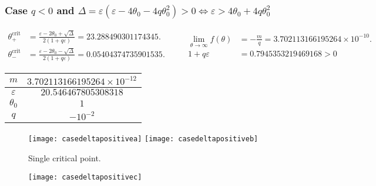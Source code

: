 \documentclass[
    8pt,
    aspectratio=1610,
    c,
    intlimits,
    leqno,
    professionalfonts,
]{beamer}
\begin{document}
\begin{frame}
	\frametitle{Case $q<0$ and
		\begin{math}
			\Delta=
			\varepsilon\left(\varepsilon-4\theta_{0}-4q\theta^{2}_{0}\right)>
			0\iff\varepsilon>4\theta_{0}+4q\theta^{2}_{0}
		\end{math}
	}
	\begin{equation*}
		\begin{aligned}
			\theta^{\text{crit}}_{+} & =
			\frac{
				\varepsilon-2\theta_{0}+\sqrt{\Delta}
			}{
				2\left(1+q\varepsilon\right)
			}=
			23.288490301174345.          \\
			\theta^{\text{crit}}_{-} & =
			\frac{
				\varepsilon-2\theta_{0}-\sqrt{\Delta}
			}{
				2\left(1+q\varepsilon\right)
			}=
			0.05404374735901535.
		\end{aligned}\qquad
		\begin{aligned}
			\lim_{\theta\to\infty}f\left(\theta\right) & =
			-\frac{m}{q}=
			3.702113166195264\times 10^{-10}.              \\
			1+q\varepsilon                             & =
			0.7945353219469168>0
		\end{aligned}
	\end{equation*}

	\begin{table}[ht!]
		\begin{tabular}{cc}
			\hline
			$m$           & $3.702113166195264\times 10^{-12}$ \\
			\hline
			$\varepsilon$ & $20.546467805308318$               \\
			\hline
			$\theta_{0}$  & $1$                                \\
			\hline
			$q$           & $-10^{-2}$                         \\
			\hline
		\end{tabular}
	\end{table}

	\begin{figure}[ht!]
		\centering
		\texttt{[image: casedeltapositivea]}
		\texttt{[image: casedeltapositiveb]}
		\caption{Single critical point.}
	\end{figure}
\end{frame}

\begin{frame}
	\begin{figure}[ht!]
		\centering
		\texttt{[image: casedeltapositivec]}
	\end{figure}
\end{frame}
\end{document}
